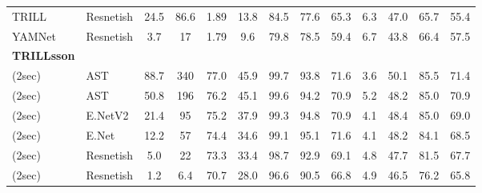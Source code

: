 \begin{centering}
\begin{table*}[t]
\begin{tabular}{@{} llcc|ccccccccc @{}}
\quad TRILL     & Resnetish 
& 24.5 & 86.6 & 1.89 & 13.8 & 84.5 & 77.6 & 65.3 & 6.3 & 47.0 & 65.7 & 55.4 \\
\quad YAMNet     & Resnetish
& 3.7 & 17 & 1.79 & 9.6 & 79.8 & 78.5 & 59.4 & 6.7 & 43.8 & 66.4 & 57.5 \\
\midrule
\textbf{TRILLsson} \\
\quad 5 (2sec) & \scriptsize{AST} %
& 88.7 & 340 & 77.0 & 45.9 & 99.7 & 93.8 & 71.6 & 3.6 & 50.1 & 85.5 & 71.4  \\
\quad 4 (2sec) & \scriptsize{AST} %
& 50.8 & 196 & 76.2 & 45.1 & 99.6 & 94.2 & 70.9 & 5.2 & 48.2 & 85.0 & 70.9    \\
\quad 3 (2sec) & \scriptsize{E.NetV2} %
& 21.4 & 95 & 75.2 & 37.9 & 99.3 & 94.8 & 70.9 & 4.1 & 48.4 & 85.0 & 69.0    \\
\quad 2 (2sec) & \scriptsize{E.Net} %
& 12.2 & 57 & 74.4 & 34.6 & 99.1 & 95.1 & 71.6 & 4.1 & 48.2 & 84.1 & 68.5    \\
\quad 1 (2sec) & \scriptsize{Resnetish} %
& 5.0 & 22 & 73.3 & 33.4 & 98.7 & 92.9 & 69.1 & 4.8 & 47.7 & 81.5 & 67.7    \\
\quad 0 (2sec) & \scriptsize{Resnetish} %
& 1.2 & 6.4 & 70.7 & 28.0 & 96.6 & 90.5 & 66.8 & 4.9 & 46.5 & 76.2 & 65.8   \\
\bottomrule
\end{tabular}
\vspace{-3mm}
\end{table*}
\end{centering}